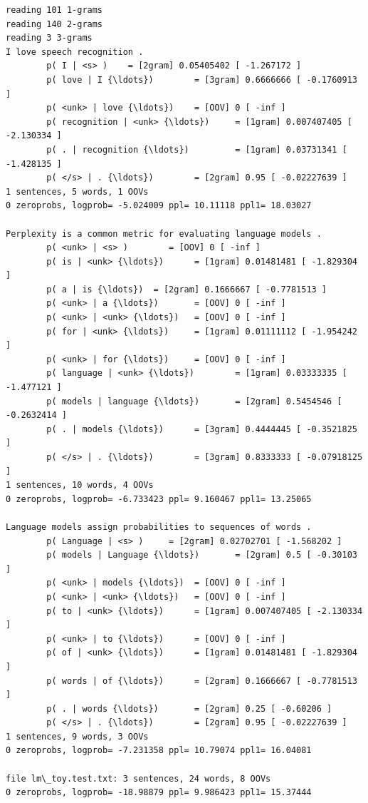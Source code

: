 \documentclass[11pt]{article}
\begin{document}
    \begin{Verbatim}[commandchars=\\\{\}]
reading 101 1-grams
reading 140 2-grams
reading 3 3-grams
I love speech recognition .
        p( I | <s> )    = [2gram] 0.05405402 [ -1.267172 ]
        p( love | I {\ldots})        = [3gram] 0.6666666 [ -0.1760913 ]
        p( <unk> | love {\ldots})    = [OOV] 0 [ -inf ]
        p( recognition | <unk> {\ldots})     = [1gram] 0.007407405 [ -2.130334 ]
        p( . | recognition {\ldots})         = [1gram] 0.03731341 [ -1.428135 ]
        p( </s> | . {\ldots})        = [2gram] 0.95 [ -0.02227639 ]
1 sentences, 5 words, 1 OOVs
0 zeroprobs, logprob= -5.024009 ppl= 10.11118 ppl1= 18.03027

Perplexity is a common metric for evaluating language models .
        p( <unk> | <s> )        = [OOV] 0 [ -inf ]
        p( is | <unk> {\ldots})      = [1gram] 0.01481481 [ -1.829304 ]
        p( a | is {\ldots})  = [2gram] 0.1666667 [ -0.7781513 ]
        p( <unk> | a {\ldots})       = [OOV] 0 [ -inf ]
        p( <unk> | <unk> {\ldots})   = [OOV] 0 [ -inf ]
        p( for | <unk> {\ldots})     = [1gram] 0.01111112 [ -1.954242 ]
        p( <unk> | for {\ldots})     = [OOV] 0 [ -inf ]
        p( language | <unk> {\ldots})        = [1gram] 0.03333335 [ -1.477121 ]
        p( models | language {\ldots})       = [2gram] 0.5454546 [ -0.2632414 ]
        p( . | models {\ldots})      = [3gram] 0.4444445 [ -0.3521825 ]
        p( </s> | . {\ldots})        = [3gram] 0.8333333 [ -0.07918125 ]
1 sentences, 10 words, 4 OOVs
0 zeroprobs, logprob= -6.733423 ppl= 9.160467 ppl1= 13.25065

Language models assign probabilities to sequences of words .
        p( Language | <s> )     = [2gram] 0.02702701 [ -1.568202 ]
        p( models | Language {\ldots})       = [2gram] 0.5 [ -0.30103 ]
        p( <unk> | models {\ldots})  = [OOV] 0 [ -inf ]
        p( <unk> | <unk> {\ldots})   = [OOV] 0 [ -inf ]
        p( to | <unk> {\ldots})      = [1gram] 0.007407405 [ -2.130334 ]
        p( <unk> | to {\ldots})      = [OOV] 0 [ -inf ]
        p( of | <unk> {\ldots})      = [1gram] 0.01481481 [ -1.829304 ]
        p( words | of {\ldots})      = [2gram] 0.1666667 [ -0.7781513 ]
        p( . | words {\ldots})       = [2gram] 0.25 [ -0.60206 ]
        p( </s> | . {\ldots})        = [2gram] 0.95 [ -0.02227639 ]
1 sentences, 9 words, 3 OOVs
0 zeroprobs, logprob= -7.231358 ppl= 10.79074 ppl1= 16.04081

file lm\_toy.test.txt: 3 sentences, 24 words, 8 OOVs
0 zeroprobs, logprob= -18.98879 ppl= 9.986423 ppl1= 15.37444
    \end{Verbatim}
\end{document}
